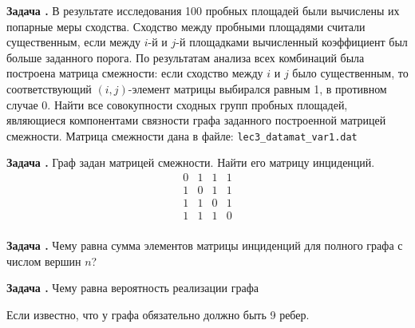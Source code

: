 \documentclass[12pt, a4paper]{article}
\newcounter{tasknum}
\newcommand{\task}{\addtocounter{tasknum}{1}
\textbf{Задача \arabic{tasknum}.\,\,}}
\begin{document}
\task В результате исследования 100 пробных площадей были вычислены их попарные меры сходства. 
Сходство между пробными площадями считали существенным, если между $i$-й и $j$-й площадками
вычисленный коэффициент был больше заданного порога. По результатам анализа всех комбинаций была
построена матрица смежности: если сходство между $i$ и $j$ было существенным, то соответствующий $(i,j)$-элемент
матрицы выбирался равным 1, в противном случае 0. Найти все совокупности сходных групп пробных площадей, являющиеся
компонентами связности графа заданного построенной матрицей смежности. Матрица смежности дана в файле: 
\texttt{lec3\_datamat\_var1.dat}



\task Граф задан матрицей смежности. Найти его матрицу инциденций.
$$
\begin{array}{llll}
0 & 1 & 1 & 1\\
1 & 0 & 1 & 1\\
1 & 1 & 0 & 1\\
1 & 1 & 1 & 0\\
\end{array}
$$



\task Чему равна сумма элементов матрицы инциденций для полного графа с числом вершин $n$?



\task Чему равна вероятность реализации графа
\begin{figure}[H]
\centering
{}
\end{figure}
Если известно, что у графа обязательно должно быть 9 ребер. 
\end{document}
